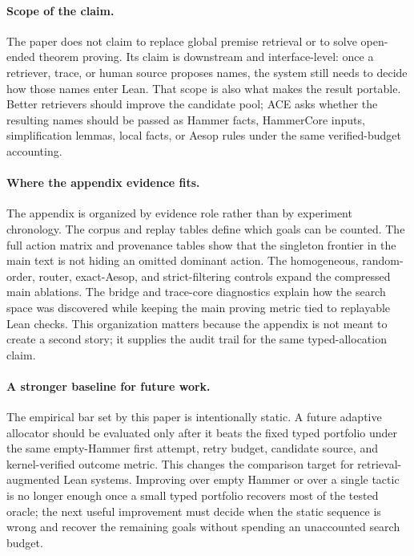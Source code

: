\documentclass{article}
\newcommand{\tap}{\textsc{ACE}}
\begin{document}
\paragraph{Scope of the claim.}
The paper does not claim to replace global premise retrieval or to solve open-ended theorem proving. Its claim is downstream and interface-level: once a retriever, trace, or human source proposes names, the system still needs to decide how those names enter Lean. That scope is also what makes the result portable. Better retrievers should improve the candidate pool; \tap{} asks whether the resulting names should be passed as Hammer facts, HammerCore inputs, simplification lemmas, local facts, or Aesop rules under the same verified-budget accounting.

\paragraph{Where the appendix evidence fits.}
The appendix is organized by evidence role rather than by experiment chronology. The corpus and replay tables define which goals can be counted. The full action matrix and provenance tables show that the singleton frontier in the main text is not hiding an omitted dominant action. The homogeneous, random-order, router, exact-Aesop, and strict-filtering controls expand the compressed main ablations. The bridge and trace-core diagnostics explain how the search space was discovered while keeping the main proving metric tied to replayable Lean checks. This organization matters because the appendix is not meant to create a second story; it supplies the audit trail for the same typed-allocation claim.

\paragraph{A stronger baseline for future work.}
The empirical bar set by this paper is intentionally static. A future adaptive allocator should be evaluated only after it beats the fixed typed portfolio under the same empty-Hammer first attempt, retry budget, candidate source, and kernel-verified outcome metric. This changes the comparison target for retrieval-augmented Lean systems. Improving over empty Hammer or over a single tactic is no longer enough once a small typed portfolio recovers most of the tested oracle; the next useful improvement must decide when the static sequence is wrong and recover the remaining goals without spending an unaccounted search budget.
\end{document}
